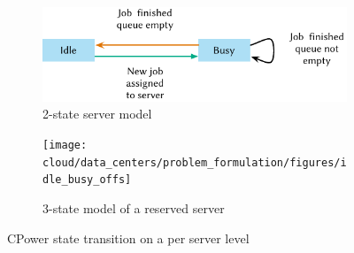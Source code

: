 \begin{figure}
	\begin{subfigure}[b]{\textwidth}
	\centering
	\includegraphics{cloud/data_centers/problem_formulation/figures/idle_busy}
	\caption{2-state server model}\label{fig:sec:cloud:data_centers:problem_formulation:servers:two_state}
	\end{subfigure} 
	\begin{subfigure}[b]{\textwidth}
	\centering
	\texttt{[image: cloud/data\_centers/problem\_formulation/figures/idle\_busy\_offs]}
	\caption{3-state model of a reserved server}\label{fig:sec:cloud:data_centers:problem_formulation:three_state}
	\end{subfigure}

	\caption{CPower state transition on a per server level}\label{fig:sec:cloud:data_centers:problem_formulation:servers}
\end{figure}
